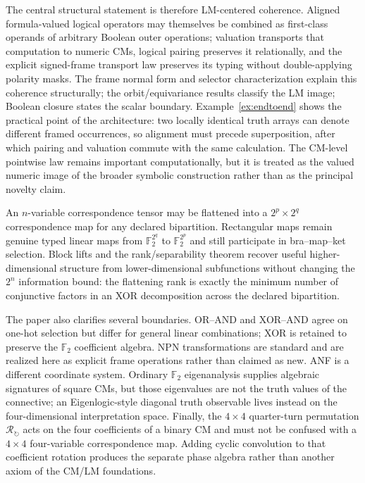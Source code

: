 \documentclass[11pt]{article}
\theoremstyle{definition}
\theoremstyle{remark}
\newcommand{\F}{\mathbb F}
\begin{document}
The central structural statement is therefore LM-centered coherence.  Aligned formula-valued logical operators may themselves be combined as first-class operands of arbitrary Boolean outer operations; valuation transports that computation to numeric CMs, logical pairing preserves it relationally, and the explicit signed-frame transport law preserves its typing without double-applying polarity masks.  The frame normal form and selector characterization explain this coherence structurally; the orbit/equivariance results classify the LM image; Boolean closure states the scalar boundary.  Example~\ref{ex:endtoend} shows the practical point of the architecture: two locally identical truth arrays can denote different framed occurrences, so alignment must precede superposition, after which pairing and valuation commute with the same calculation.  The CM-level pointwise law remains important computationally, but it is treated as the valued numeric image of the broader symbolic construction rather than as the principal novelty claim.

An $n$-variable correspondence tensor may be flattened into a $2^p\times2^q$ correspondence map for any declared bipartition.  Rectangular maps remain genuine typed linear maps from $\F_2^{2^q}$ to $\F_2^{2^p}$ and still participate in bra--map--ket selection.  Block lifts and the rank/separability theorem recover useful higher-dimensional structure from lower-dimensional subfunctions without changing the $2^n$ information bound: the flattening rank is exactly the minimum number of conjunctive factors in an XOR decomposition across the declared bipartition.

The paper also clarifies several boundaries.  OR--AND and XOR--AND agree on one-hot selection but differ for general linear combinations; XOR is retained to preserve the $\F_2$ coefficient algebra.  NPN transformations are standard and are realized here as explicit frame operations rather than claimed as new.  ANF is a different coordinate system.  Ordinary $\F_2$ eigenanalysis supplies algebraic signatures of square CMs, but those eigenvalues are not the truth values of the connective; an Eigenlogic-style diagonal truth observable lives instead on the four-dimensional interpretation space.  Finally, the $4\times4$ quarter-turn permutation $\mathcal R_{\circlearrowright}$ acts on the four coefficients of a binary CM and must not be confused with a $4\times4$ four-variable correspondence map.  Adding cyclic convolution to that coefficient rotation produces the separate phase algebra rather than another axiom of the CM/LM foundations.
\end{document}
